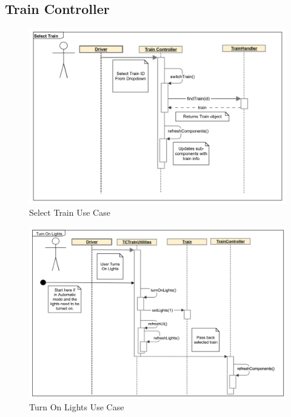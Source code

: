 \documentclass[]{article}
\begin{document}
\subsection{Train Controller}

\begin{figure}[H]
	\centering
	\includegraphics[scale=.3]{tc_selectTrain_usecase}
	\caption{Select Train Use Case}
\end{figure}

\begin{figure}[H]
	\centering
	\includegraphics[scale=.3]{tc_turnOnLights_usecase}
	\caption{Turn On Lights Use Case}
\end{figure}
\end{document}
